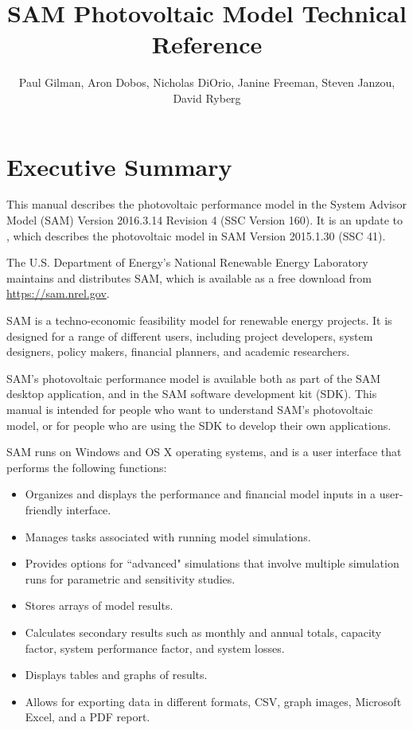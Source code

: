 \documentclass[12pt,letterpaper]{article}
\title{SAM Photovoltaic Model Technical Reference}
\author{Paul Gilman, Aron Dobos, Nicholas DiOrio, Janine Freeman, Steven Janzou, David Ryberg}
\begin{document}
\frontmatter
\chapter*{Executive Summary}

This manual describes the photovoltaic performance model in the System Advisor Model (SAM) Version 2016.3.14 Revision 4 (SSC Version 160). It is an update to \citet{gilman2015}, which describes the photovoltaic model in SAM Version 2015.1.30 (SSC 41).

The U.S. Department of Energy's National Renewable Energy Laboratory maintains and distributes SAM, which is available as a free download from \url{https://sam.nrel.gov}.

SAM is a techno-economic feasibility model for renewable energy projects. It is designed for a range of different users, including project developers, system designers, policy makers, financial planners, and academic researchers.

SAM's photovoltaic performance model is available both as part of the SAM desktop application, and in the SAM software development kit (SDK). This manual is intended for people who want to understand SAM's photovoltaic model, or for people who are using the SDK to develop their own applications.

SAM runs on Windows and OS X operating systems, and is a user interface that performs the following functions:

\begin{itemize}
\item Organizes and displays the performance and financial model inputs in a user-friendly interface.
\item Manages tasks associated with running model simulations.
\item Provides options for ``advanced" simulations that involve multiple simulation runs for parametric and sensitivity studies.
\item Stores arrays of model results.
\item Calculates secondary results such as monthly and annual totals, capacity factor, system performance factor, and system losses.
\item Displays tables and graphs of results.
\item Allows for exporting data in different formats, CSV, graph images, Microsoft Excel, and a PDF report.
\end{itemize}
\end{document}
